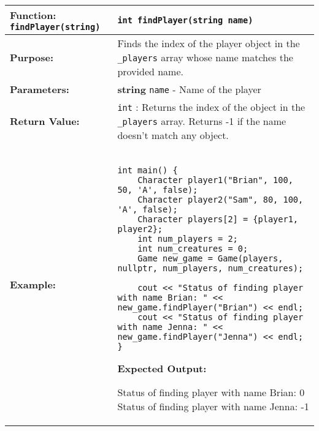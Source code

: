 \newpage
\renewcommand{\arraystretch}{1.5}
\begin{longtable}{|p{2.0in}|p{4.0in}|}
\hline
\textbf{Function:} \texttt{findPlayer(string)} & \texttt{int findPlayer(string name)} \\ \hline

\textbf{Purpose:} & Finds the index of the player object in the \texttt{_players} array whose name matches the provided name. \\ \hline

\textbf{Parameters:} & 
\textbf{string} \texttt{name} - Name of the player \\ \hline

\textbf{Return Value:} & \texttt{int} : Returns the index of the object in the \texttt{_players} array. Returns -1 if the name doesn't match any object. \\ \hline

\textbf{Example:} & 

\begin{example}
\begin{verbatim}

int main() {
    Character player1("Brian", 100, 50, 'A', false);
    Character player2("Sam", 80, 100, 'A', false);
    Character players[2] = {player1, player2};
    int num_players = 2;
    int num_creatures = 0;
    Game new_game = Game(players, nullptr, num_players, num_creatures);

    cout << "Status of finding player with name Brian: " << new_game.findPlayer("Brian") << endl;
    cout << "Status of finding player with name Jenna: " << new_game.findPlayer("Jenna") << endl;
}
\end{verbatim}
\end{example}

\textbf{Expected Output:} 

\vspace{5pt}
Status of finding player with name Brian: 0 \newline
Status of finding player with name Jenna: -1
\vspace{5pt}
\\ \hline
\end{longtable}

